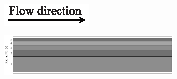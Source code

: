 \documentclass[preprint,12pt]{elsarticle}
\begin{document}
\begin{figure}
     \centering
     \begin{subfigure}[b]{\textwidth}
     	\includegraphics[width=\textwidth]{flow_dir.eps}
     \end{subfigure}
     \begin{subfigure}[b]{0.85\textwidth}
\includegraphics[width=\textwidth]{results/segments/5segEq/20C80T/seg.png}
     \end{subfigure}
     \hfill
     \begin{subfigure}[b]{0.1\textwidth}

\end{subfigure}
\end{figure}
\end{document}
